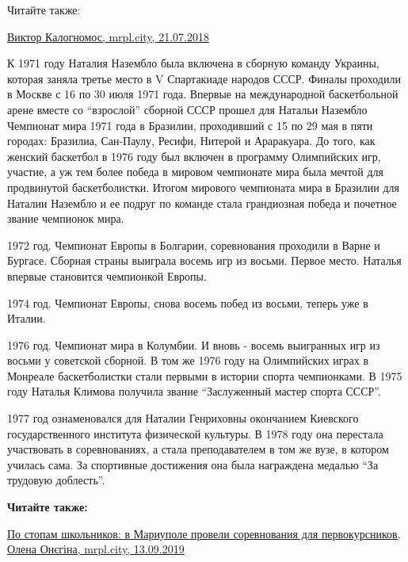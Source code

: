 Читайте также: 

\href{https://archive.org/details/21_07_2018.sergij_burov.mrpl_city.viktor_kalognomos}{%
Виктор Калогномос, mrpl.city, 21.07.2018}

К 1971 году Наталия Назембло была включена в сборную команду Украины, которая
заняла третье место в V Спартакиаде народов СССР. Финалы проходили в Москве с
16 по 30 июля 1971 года. Впервые на международной баскетбольной арене вместе со
\enquote{взрослой} сборной СССР прошел для Натальи Назембло Чемпионат мира 1971 года в
Бразилии, проходивший с 15 по 29 мая в пяти городах: Бразилиа, Сан-Паулу,
Ресифи, Нитерой и Араракуара. До того, как женский баскетбол в 1976 году был
включен в программу Олимпийских игр, участие, а уж тем более победа в мировом
чемпионате мира была мечтой для продвинутой баскетболистки. Итогом мирового
чемпионата мира в Бразилии для Наталии Назембло и ее подруг по команде стала
грандиозная победа и почетное звание чемпионок мира.

1972 год. Чемпионат Европы в Болгарии, соревнования проходили в Варне и
Бургасе. Сборная страны выиграла восемь игр из восьми. Первое место. Наталья
впервые становится чемпионкой Европы.

1974 год. Чемпионат Европы, снова восемь побед из восьми, теперь уже в Италии.

1976 год. Чемпионат мира в Колумбии. И вновь - восемь выигранных игр из восьми
у советской сборной. В том же 1976 году на Олимпийских играх в Монреале
баскетболистки стали первыми в истории спорта чемпионками. В 1975 году Наталья
Климова получила звание \enquote{Заслуженный мастер спорта СССР}.

1977 год ознаменовался для Наталии Генриховны окончанием Киевского
государственного института физической культуры. В 1978 году она перестала
участвовать в соревнованиях, а стала преподавателем в том же вузе, в котором
училась сама. За спортивные достижения она была награждена медалью \enquote{За
трудовую доблесть}.

\textbf{Читайте также:} 

\href{https://mrpl.city/news/view/po-stopam-shkolnikov-v-mariupole-proveli-sorevnovaniya-dlya-pervokursnikov-video}{%
По стопам школьников: в Мариуполе провели соревнования для первокурсников, Олена Онєгіна, mrpl.city, 13.09.2019}

